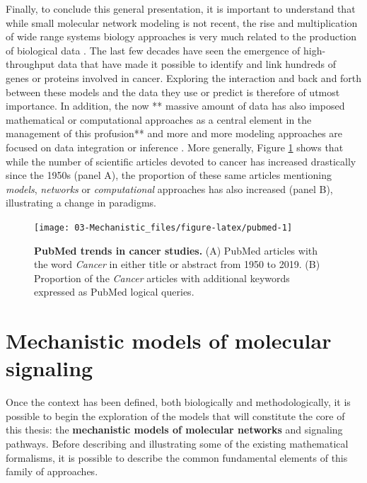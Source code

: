 \documentclass[a4paper,12pt,twoside,onecolumn,openright,final,oldfontcommands]{memoir}
\begin{document}
Finally, to conclude this general presentation, it is important to
understand that while small molecular network modeling is not recent,
the rise and multiplication of wide range systems biology approaches is
very much related to the production of biological data
\citep{de2002modeling}. The last few decades have seen the emergence of
high-throughput data that have made it possible to identify and link
hundreds of genes or proteins involved in cancer. Exploring the
interaction and back and forth between these models and the data they
use or predict is therefore of utmost importance. In addition, the now
** massive amount of data has also imposed mathematical or computational
approaches as a central element in the management of this profusion**
and more and more modeling approaches are focused on data integration or
inference \citep{frohlich2018efficient, bouhaddou2018mechanistic}. More
generally, Figure \ref{fig:pubmed} shows that while the number of
scientific articles devoted to cancer has increased drastically since
the 1950s (panel A), the proportion of these same articles mentioning
\emph{models}, \emph{networks} or \emph{computational} approaches has
also increased (panel B), illustrating a change in paradigms.

\begin{figure}

{\centering \texttt{[image: 03-Mechanistic\_files/figure-latex/pubmed-1]} 

}

\caption[PubMed trends in cancer studies.]{\textbf{PubMed trends in cancer studies.} (A)
PubMed articles with the word \emph{Cancer} in either title or abstract
from 1950 to 2019. (B) Proportion of the \emph{Cancer} articles with
additional keywords expressed as PubMed logical queries.}\label{fig:pubmed}
\end{figure}






\section{Mechanistic models of molecular
signaling}\label{mechanistic-models-of-molecular-signaling}

Once the context has been defined, both biologically and
methodologically, it is possible to begin the exploration of the models
that will constitute the core of this thesis: the \textbf{mechanistic
models of molecular networks} and signaling pathways. Before describing
and illustrating some of the existing mathematical formalisms, it is
possible to describe the common fundamental elements of this family of
approaches.
\end{document}
